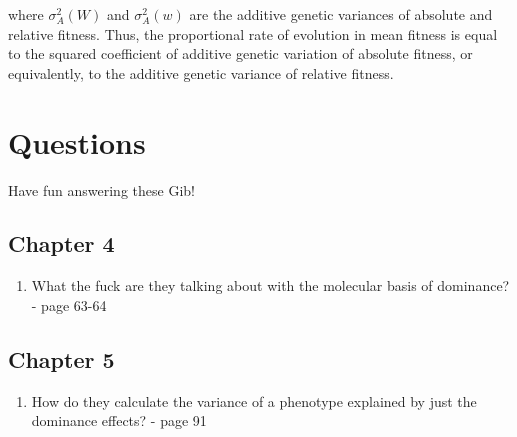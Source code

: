 \documentclass[
]{book}
\providecommand{\tightlist}{%
  \setlength{\itemsep}{0pt}\setlength{\parskip}{0pt}}
\begin{document}
where \(\sigma^2_A(W)\) and \(\sigma^2_A(w)\) are the additive genetic variances of absolute and relative fitness. Thus, the proportional rate of evolution in mean fitness is equal to the squared coefficient of additive genetic variation of absolute fitness, or equivalently, to the additive genetic variance of relative fitness.

\hypertarget{questions}{%
\chapter*{Questions}\label{questions}}

Have fun answering these Gib!

\hypertarget{chapter-4}{%
\section*{Chapter 4}\label{chapter-4}}

\begin{enumerate}
\def\labelenumi{\arabic{enumi}.}
\tightlist
\item
  What the fuck are they talking about with the molecular basis of dominance? - page 63-64
\end{enumerate}

\hypertarget{chapter-5}{%
\section*{Chapter 5}\label{chapter-5}}

\begin{enumerate}
\def\labelenumi{\arabic{enumi}.}
\tightlist
\item
  How do they calculate the variance of a phenotype explained by just the dominance effects? - page 91
\end{enumerate}
\end{document}
